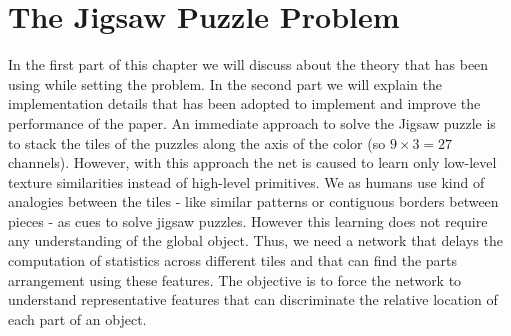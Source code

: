\section{The Jigsaw Puzzle Problem}
In the first part of this chapter we will discuss about the theory that has been using while setting the problem. In the second part we will explain the implementation details that has been adopted to implement and improve the performance of the paper.\newline
An immediate approach to solve the Jigsaw puzzle is to stack the tiles of the puzzles along the axis of the color (so \(9\times3=27\) channels). However, with this approach the net is caused to learn only low-level texture similarities instead of high-level primitives. We as humans use kind of analogies between the tiles - like similar patterns or contiguous borders between pieces - as cues to solve jigsaw puzzles. However this learning does not require any understanding of the global object. Thus, we need a network that delays the computation of statistics across different tiles and that can find the parts arrangement using these features. The objective is to force the network to understand representative features that can discriminate the relative location of each part of an object.


